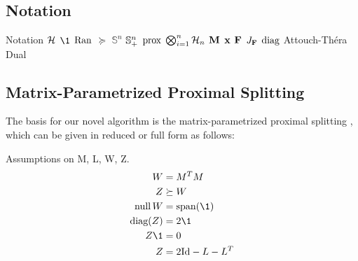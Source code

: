 \subsection{Notation}
Notation
$\mathcal{H}$
$\1$
$\operatorname{Ran}$
$\succeq$
$\mathbb{S}^n$
$\mathbb{S}_+^n$
$\operatorname{prox}$
$\bigotimes_{i=1}^n \mathcal{H}_n$
$\mathbf{M}$
$\mathbf{x}$
$\mathbf{F}$
$J_{\mathbf{F}}$
$\text{diag}$
Attouch-Th\'era Dual
\subsection{Matrix-Parametrized Proximal Splitting}
The basis for our novel algorithm is the matrix-parametrized proximal splitting \cite{bassett2024optimaldesignresolventsplitting}, which can be given in reduced or full form as follows:

Assumptions on M, L, W, Z.
\begin{align}\label{oars}
    W &= M^T M \\
    Z &\succeq W \\
    \nullspace{W} &= \text{span}(\1)\\
    \text{diag}(Z) &=2\1 \\ 
    Z \1 &= 0 \\
    Z &= 2\I - L - L^T
\end{align} 

